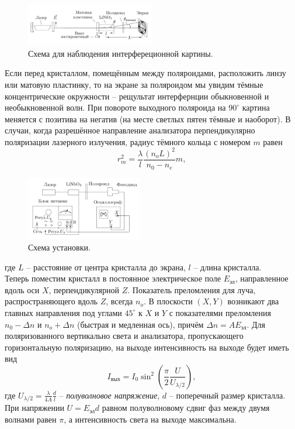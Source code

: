 \documentclass[11pt]{article}
\begin{document}
\begin{figure}
\begin{center}
\includegraphics[width = 0.5\textwidth]{1.png}
\end{center}
\vspace{-20pt}
\caption{Схема для наблюдения интерфереционной картины.}
\end{figure}

Если перед кристаллом, помещённым между поляроидами, расположить линзу или матовую пластинку, то на экране за поляроидом мы увидим тёмные концентрические окружности -- рещультат интерфернции обыкновенной и необыкновенной волн. При повороте выходного поляроида на $90^\circ$ картина меняется с позитива на негатив (на месте светлых пятен тёмные и наоборот). В случаи, когда разрешённое направление анализатора перпендикулярно поляризации лазерного излучения, радиус тёмного кольца с номером $m$ равен
\begin{equation}
r_m^2 = \dfrac{\lambda}{l} \dfrac{(n_oL)^2}{n_0 - n_e}m,
\end{equation}

\begin{figure}
\begin{center}
\includegraphics[width = 0.45\textwidth]{2.png}
\end{center}
\vspace{-20pt}
\caption{Схема установки.}
\end{figure}

где $L$ -- расстояние от центра кристалла до экрана, $l$ -- длина кристалла.\\
Теперь поместим кристалл в постоянное электрическое поле $E_{\text{эл}}$, направленное вдоль оси $X$, перпендикулярной $Z$. Показатель преломления для луча, распространяющего вдоль $Z$, всегда $n_o$. В плоскости $(X,Y)$ возникают два главных направления под углами $45^\circ$ к $X$ и $Y$ с показателями преломления $n_0 - \Delta n$ и $n_o + \Delta n$ (быстрая и медленная ось), причём $\Delta n = A E_{\text{эл}}$. Для поляризованного вертикально света и анализатора, пропускающего горизонтальную поляризацию, на выходе интенсивность на выходе будет иметь вид
\begin{equation}
I_{\text{вых}} = I_0 \sin^2 \left(\dfrac{\pi}{2} \dfrac{U}{U_{\lambda/2}} \right),
\end{equation}
где $U_{\lambda/2} = \frac{\lambda}{4A}\frac{d}{l}$ -- \textit{полуволновое напряжение}, $d$ -- поперечный размер кристалла.  При напряжении $U = E_{\text{эл}}d$ равном полуволновому сдвиг фаз между двумя волнами равен $\pi$, а интенсивность света на выходе максимальна. 
\end{document}
